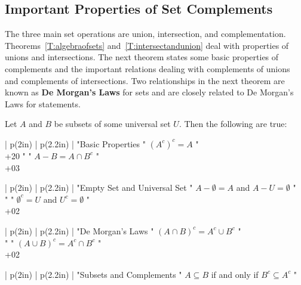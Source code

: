 \subsection*{Important Properties of Set Complements}
The three main set operations are union, intersection, and complementation.  Theorems~\ref{T:algebraofsets} and~\ref{T:intersectandunion} deal with properties of unions and intersections.  The next theorem states some basic properties of complements and the important relations dealing with complements of unions and complements of intersections.  Two relationships in the next theorem are known as \textbf{De Morgan's Laws}
 for sets and are closely related to De Morgan's Laws for statements.
%
\begin{theorem} \label{T:propsofcomplements}
Let  $A$  and  $B$  be subsets of some universal set  $U$.  Then the following are true:

\BeginTable
\BeginFormat
| p(2in) |  p(2.2in) |
\EndFormat
"Basic Properties    "  $\left( A^c \right)^c = A$ " \\+20
"                    "  $A - B = A \cap B^c$   " \\+03
\EndTable

\BeginTable
\BeginFormat
| p(2in) |  p(2.2in) |
\EndFormat
"Empty Set and Universal Set      "  $A - \emptyset = A$ and $A - U = \emptyset$ " \\
"                    "  ${\emptyset}^c = U$ and $U^c = \emptyset$ " \\+02
\EndTable

\BeginTable
\BeginFormat
| p(2in) |  p(2.2in) |
\EndFormat
"De Morgan's Laws
%
    "  $\left ({A \cap B} \right)^c = A^c \cup B^c$ " \\
"                    "  $\left ({A \cup B} \right)^c = A^c \cap B^c$ " \\+02
\EndTable

\BeginTable
\BeginFormat
| p(2in) |  p(2.2in) |
\EndFormat
"Subsets and Complements        "  $A \subseteq B$ if and only if $B^c \subseteq A^c$ " \\
\EndTable
\end{theorem}

